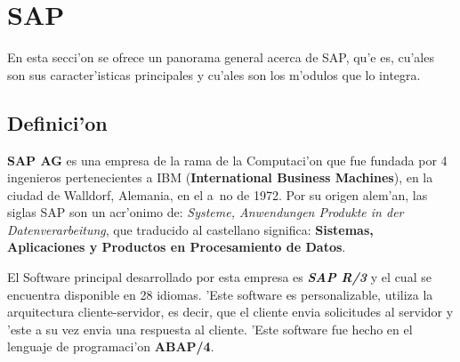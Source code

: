 \section{SAP}

En esta secci'on se ofrece un panorama general acerca de SAP, qu'e es, cu'ales son sus caracter'isticas principales y cu'ales son los m'odulos que lo integra.

\subsection{Definici'on} \label{subsect:defprop}
\textbf{SAP AG} es una empresa de la rama de la Computaci'on que fue fundada por 4 ingenieros pertenecientes a IBM (\textbf{International Business Machines}), en la ciudad de Walldorf, Alemania, en el a~no de 1972. Por su origen alem'an, las siglas SAP son un acr'onimo de: \textit{Systeme, Anwendungen Produkte in der Datenverarbeitung}, que traducido al castellano significa: \textbf{Sistemas, Aplicaciones y Productos en Procesamiento de Datos}. 

El Software principal desarrollado por esta empresa es \textbf{\textit{SAP R/3}} y el cual se encuentra disponible en 28 idiomas. 'Este software es personalizable, utiliza la arquitectura cliente-servidor, es decir, que el cliente envia solicitudes al servidor y 'este a su vez envia una respuesta al cliente. 'Este software fue hecho en el lenguaje de programaci'on \textbf{ABAP/4}. 

\subsection{}










